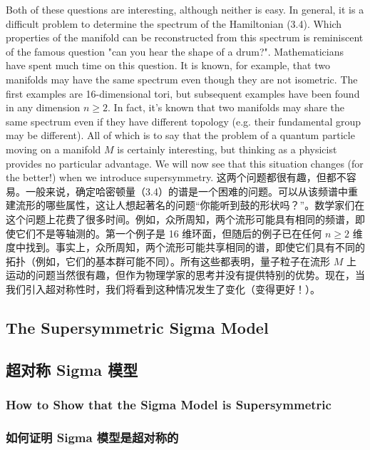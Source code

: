 \documentclass{article}
\begin{document}
\begin{paracol}{2}
Both of these questions are interesting, although neither is easy. In general, it is a diﬃcult problem to determine the spectrum of the Hamiltonian (3.4). Which properties of the manifold can be reconstructed from this spectrum is reminiscent of the famous question "can you hear the shape of a drum?". Mathematicians have spent much time on this question. It is known, for example, that two manifolds may have the same spectrum even though they are not isometric. The ﬁrst examples are 16-dimensional tori, but subsequent examples have been found in any dimension $n \geq 2$. In fact, it’s known that two manifolds may share the same spectrum even if they have diﬀerent topology (e.g. their fundamental group may be diﬀerent). All of which is to say that the problem of a quantum particle moving on a manifold $M$ is certainly interesting, but thinking as a physicist provides no particular advantage. We will now see that this situation changes (for the better!) when we introduce supersymmetry.
\switchcolumn
这两个问题都很有趣，但都不容易。一般来说，确定哈密顿量（3.4）的谱是一个困难的问题。可以从该频谱中重建流形的哪些属性，这让人想起著名的问题“你能听到鼓的形状吗？”。数学家们在这个问题上花费了很多时间。例如，众所周知，两个流形可能具有相同的频谱，即使它们不是等轴测的。第一个例子是 16 维环面，但随后的例子已在任何 $n \geq 2$ 维度中找到。事实上，众所周知，两个流形可能共享相同的谱，即使它们具有不同的拓扑（例如，它们的基本群可能不同）。所有这些都表明，量子粒子在流形 $M$ 上运动的问题当然很有趣，但作为物理学家的思考并没有提供特别的优势。现在，当我们引入超对称性时，我们将看到这种情况发生了变化（变得更好！）。
\switchcolumn*

\subsection{The Supersymmetric Sigma Model}
\switchcolumn
\subsection*{超对称 Sigma 模型}
\switchcolumn*

\subsubsection{How to Show that the Sigma Model is Supersymmetric}
\switchcolumn
\subsubsection*{如何证明 Sigma 模型是超对称的}
\switchcolumn*


\end{paracol}
\end{document}
